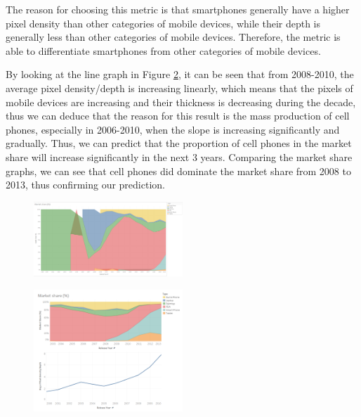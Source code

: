 \documentclass[conference]{IEEEtran}
\begin{document}
The reason for choosing this metric is that smartphones generally have a higher pixel density than other categories of mobile devices, while their depth is generally less than other categories of mobile devices. Therefore, the metric is able to differentiate smartphones from other categories of mobile devices.

By looking at the line graph in Figure \ref{fig:pixel}, it can be seen that from 2008-2010, the average pixel density/depth is increasing linearly, which means that the pixels of mobile devices are increasing and their thickness is decreasing during the decade, thus we can deduce that the reason for this result is the mass production of cell phones, especially in 2006-2010, when the slope is increasing significantly and gradually. Thus, we can predict that the proportion of cell phones in the market share will increase significantly in the next 3 years. Comparing the market share graphs, we can see that cell phones did dominate the market share from 2008 to 2013, thus confirming our prediction.

\begin{figure}
    \centering
    \includegraphics[width=0.5\textwidth]{../Visualisations/C/Market share 2010.png}
    \caption{}
    \label{fig:market-2010}
\end{figure}

\begin{figure}
    \centering
    \includegraphics[width=0.5\textwidth]{../Visualisations/C/Piexel density.png}
    \caption{}
    \label{fig:pixel}
\end{figure}

\end{document}
